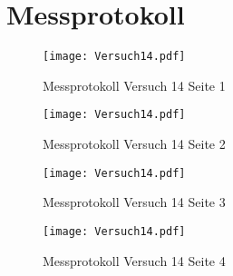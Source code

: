 \section{Messprotokoll}
\begin{figure}[h!]
    \centering
    \texttt{[image: Versuch14.pdf]}
    \caption{Messprotokoll Versuch 14 Seite 1}
\end{figure}
\clearpage
\newpage
\begin{figure}[h!]
    \centering
    \texttt{[image: Versuch14.pdf]}
    \caption{Messprotokoll Versuch 14 Seite 2}
\end{figure}
\newpage
\begin{figure}[h!]
    \centering
    \texttt{[image: Versuch14.pdf]}
    \caption{Messprotokoll Versuch 14  Seite 3}
\end{figure}
\newpage
\begin{figure}[h!]
    \centering
    \texttt{[image: Versuch14.pdf]}
    \caption{Messprotokoll Versuch 14 Seite 4}
\end{figure}

\newpage